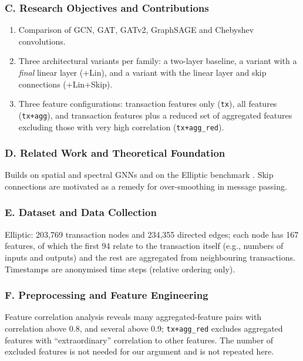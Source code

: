 \documentclass[11pt,a4paper]{article}
\begin{document}
\subsubsection*{C. Research Objectives and Contributions}
\begin{enumerate}[leftmargin=*]
    \item Comparison of GCN, GAT, GATv2, GraphSAGE and Chebyshev convolutions.
    \item Three architectural variants per family: a two-layer baseline, a variant with a \emph{final} linear layer (+Lin), and a variant with the linear layer and skip connections (+Lin+Skip).
    \item Three feature configurations: transaction features only (\texttt{tx}), all features (\texttt{tx+agg}), and transaction features plus a reduced set of aggregated features excluding those with very high correlation (\texttt{tx+agg\_red}).
\end{enumerate}

\subsubsection*{D. Related Work and Theoretical Foundation}
Builds on spatial and spectral GNNs \cite{kipf2017gcn,hamilton2017sage,velickovic2018gat} and on the Elliptic benchmark \cite{weber2019elliptic}. Skip connections are motivated as a remedy for over-smoothing in message passing.

\subsubsection*{E. Dataset and Data Collection}
Elliptic: 203,769 transaction nodes and 234,355 directed edges; each node has 167 features, of which the first 94 relate to the transaction itself (e.g., numbers of inputs and outputs) and the rest are aggregated from neighbouring transactions. Timestamps are anonymised time steps (relative ordering only).

\subsubsection*{F. Preprocessing and Feature Engineering}
Feature correlation analysis reveals many aggregated-feature pairs with correlation above 0.8, and several above 0.9; \texttt{tx+agg\_red} excludes aggregated features with ``extraordinary'' correlation to other features. The number of excluded features is not needed for our argument and is not repeated here.
\end{document}
